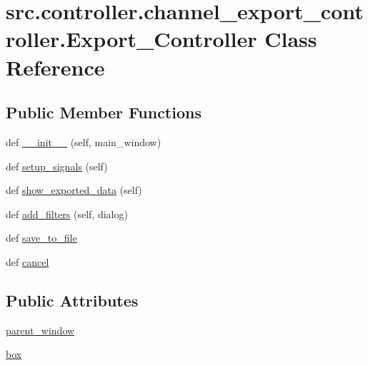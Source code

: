 \hypertarget{classsrc_1_1controller_1_1channel__export__controller_1_1Export__Controller}{}\section{src.\+controller.\+channel\+\_\+export\+\_\+controller.\+Export\+\_\+\+Controller Class Reference}
\label{classsrc_1_1controller_1_1channel__export__controller_1_1Export__Controller}
\subsection*{Public Member Functions}
\begin{DoxyCompactItemize}
\item 
def \hyperlink{classsrc_1_1controller_1_1channel__export__controller_1_1Export__Controller_a6b969ba4f3561ce43c99dec209ccfc3f}{\+\_\+\+\_\+init\+\_\+\+\_\+} (self, main\+\_\+window)
\item 
def \hyperlink{classsrc_1_1controller_1_1channel__export__controller_1_1Export__Controller_ac1634a9b62a5af450b46017c141063f3}{setup\+\_\+signals} (self)
\item 
def \hyperlink{classsrc_1_1controller_1_1channel__export__controller_1_1Export__Controller_a628bfd9180a00f7c3c48abf0f8e47229}{show\+\_\+exported\+\_\+data} (self)
\item 
def \hyperlink{classsrc_1_1controller_1_1channel__export__controller_1_1Export__Controller_ae4692545f179b2bab7272b7a2b475469}{add\+\_\+filters} (self, dialog)
\item 
def \hyperlink{classsrc_1_1controller_1_1channel__export__controller_1_1Export__Controller_a5dd0e8e515d083478b298398bffe03a6}{save\+\_\+to\+\_\+file}
\item 
def \hyperlink{classsrc_1_1controller_1_1channel__export__controller_1_1Export__Controller_a44d973390e2d489b5fda0f892bf5f4f1}{cancel}
\end{DoxyCompactItemize}
\subsection*{Public Attributes}
\begin{DoxyCompactItemize}
\item 
\hyperlink{classsrc_1_1controller_1_1channel__export__controller_1_1Export__Controller_ab5f83ab03c0824d54acd7a21e1f36813}{parent\+\_\+window}
\item 
\hyperlink{classsrc_1_1controller_1_1channel__export__controller_1_1Export__Controller_a7e1fa47f17183e725dc98b6c4a15c9a9}{box}
\end{DoxyCompactItemize}
